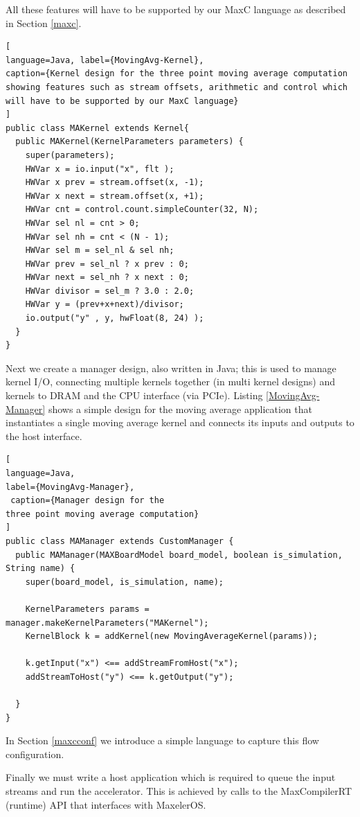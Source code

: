 All these features will have to be supported by our MaxC language as
described in Section \ref{maxc}.

\begin{lstlisting}[
language=Java, label={MovingAvg-Kernel},
caption={Kernel design for the three point moving average computation showing features such as stream offsets, arithmetic and control which will have to be supported by our MaxC language}
]
public class MAKernel extends Kernel{
  public MAKernel(KernelParameters parameters) {
    super(parameters);
    HWVar x = io.input("x", flt );
    HWVar x prev = stream.offset(x, -1);
    HWVar x next = stream.offset(x, +1);
    HWVar cnt = control.count.simpleCounter(32, N);
    HWVar sel nl = cnt > 0;
    HWVar sel nh = cnt < (N - 1);
    HWVar sel m = sel_nl & sel nh;
    HWVar prev = sel_nl ? x prev : 0;
    HWVar next = sel_nh ? x next : 0;
    HWVar divisor = sel_m ? 3.0 : 2.0;
    HWVar y = (prev+x+next)/divisor;
    io.output("y" , y, hwFloat(8, 24) );
  }
}
\end{lstlisting}


Next we create a manager design, also written in Java; this is used to
manage kernel I/O, connecting multiple kernels together (in multi
kernel designs) and kernels to DRAM and the CPU interface (via
PCIe). Listing \ref{MovingAvg-Manager} shows a simple design for the
moving average application that instantiates a single moving average
kernel and connects its inputs and outputs to the host interface.

\begin{lstlisting}[
language=Java,
label={MovingAvg-Manager},
 caption={Manager design for the
three point moving average computation}
]
public class MAManager extends CustomManager {
  public MAManager(MAXBoardModel board_model, boolean is_simulation, String name) {
    super(board_model, is_simulation, name);

    KernelParameters params = manager.makeKernelParameters("MAKernel");
    KernelBlock k = addKernel(new MovingAverageKernel(params));

    k.getInput("x") <== addStreamFromHost("x");
    addStreamToHost("y") <== k.getOutput("y");

  }
}
\end{lstlisting}

In Section \ref{maxcconf} we introduce a simple language to capture
this flow configuration.

Finally we must write a host application which is required to queue
the input streams and run the accelerator. This is achieved by calls
to the MaxCompilerRT (runtime) API that interfaces with MaxelerOS.

